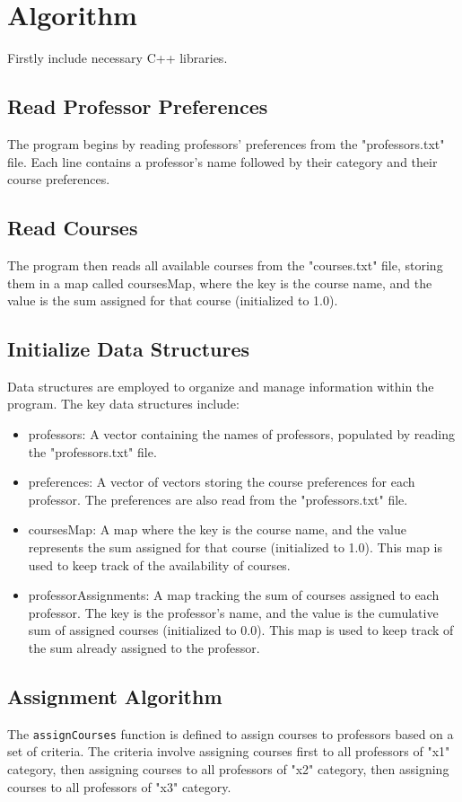 \documentclass{article}
\begin{document}
\section*{Algorithm}
Firstly include necessary C++ libraries.

\subsection*{Read Professor Preferences}
The program begins by reading professors' preferences from the "professors.txt" file. Each line contains a professor's name followed by their category and their course preferences.

\subsection*{Read Courses}
The program then reads all available courses from the "courses.txt" file, storing them in a map called coursesMap, where the key is the course name, and the value is the sum assigned for that course (initialized to 1.0).

\subsection*{Initialize Data Structures}
Data structures are employed to organize and manage information within the program. The key data structures include:
\begin{itemize}
  \item professors: A vector containing the names of professors, populated by reading the "professors.txt" file.
  \item preferences: A vector of vectors storing the course preferences for each professor. The preferences are also read from the "professors.txt" file.
  \item coursesMap: A map where the key is the course name, and the value represents the sum assigned for that course (initialized to 1.0). This map is used to keep track of the availability of courses.
  \item professorAssignments: A map tracking the sum of courses assigned to each professor. The key is the professor's name, and the value is the cumulative sum of assigned courses (initialized to 0.0). This map is used to keep track of the sum already assigned to the professor.
\end{itemize}

\subsection*{Assignment Algorithm}
The \texttt{assignCourses} function is defined to assign courses to professors based on a set of criteria. The criteria involve assigning courses first to all professors of "x1" category, then assigning courses to all professors of "x2" category, then assigning courses to all professors of "x3" category.
\end{document}
